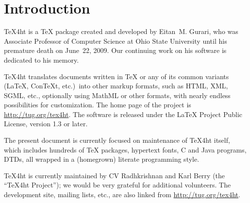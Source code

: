 
\chapter{Introduction}

\TeX{}4ht is a \TeX{} package created and developed by
Eitan~M. Gurari, who was Associate Professor of Computer Science
at Ohio State University until his premature death on June~22,
2009.  Our continuing work on his software is dedicated to his memory.

\TeX{}4ht translates documents written in \TeX{} or any of its common
variants (\LaTeX{}, Con\TeX{}t, etc.)\ into other markup formats, such
as HTML, XML, SGML, etc., optionally using MathML or other formats,
with nearly endless possibilities for customization.  The home page of
the project is \url{http://tug.org/tex4ht}.  The software is released
under the \LaTeX{} Project Public License, version 1.3 or later.

The present document is currently focused on maintenance of \TeX{}4ht
itself, which includes hundreds of \TeX{} packages, hypertext fonts, C
and Java programs, DTDs, all wrapped in a (homegrown) literate
programming style.

\TeX{}4ht is currently maintained by CV Radhkrishnan and Karl Berry
(the ``\TeX{}4ht Project''); we would be very grateful for additional
volunteers.  The development site, mailing lists, etc., are also
linked from \url{http://tug.org/tex4ht}.



